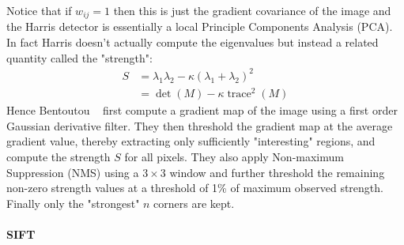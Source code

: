 Notice that if $w_{ij} = 1$ then this is just the gradient covariance of the image and the Harris detector is essentially a local Principle Components Analysis (PCA).
%
In fact Harris doesn't actually compute the eigenvalues but instead a related quantity called the "strength":
\begin{align}
    S & = \lambda_1 \lambda_2 - \kappa (\lambda_1 + \lambda_2)^2   \\
      & = \operatorname{det}(M) - \kappa \operatorname{trace}^2(M)
    \label{eqn:strength}
\end{align}
%
Hence Bentoutou \etal~ first compute a gradient map of the image using a first order Gaussian derivative filter.
%
They then threshold the gradient map at the average gradient value, thereby extracting only sufficiently "interesting" regions, and compute the strength $S$ for all pixels.
%
They also apply Non-maximum Suppression (NMS) using a $3 \times 3$ window and further threshold the remaining non-zero strength values at a threshold of 1\% of maximum observed strength.
%
Finally only the "strongest" $n$ corners are kept.

\paragraph{SIFT}

